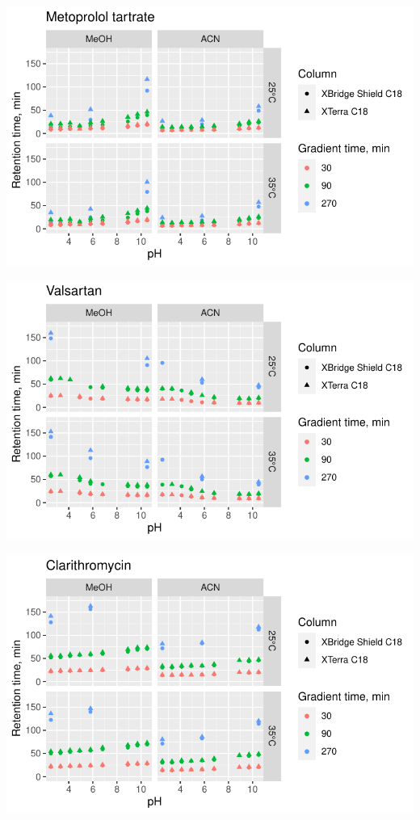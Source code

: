 \documentclass[
  letterpaper,
  DIV=11,
  numbers=noendperiod]{scrreprt}
\begin{document}
\includegraphics{index_files/figure-pdf/unnamed-chunk-4-102.pdf}

\includegraphics{index_files/figure-pdf/unnamed-chunk-4-103.pdf}

\includegraphics{index_files/figure-pdf/unnamed-chunk-4-104.pdf}
\end{document}
